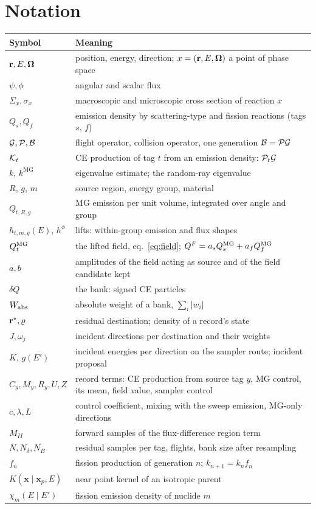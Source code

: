 \section{Notation}\label{app:notation}

\begin{longtable}{>{\raggedright}p{3.2cm}p{11cm}}
\toprule
Symbol & Meaning\\
\midrule
$\mathbf r,E,\boldsymbol\Omega$ & position, energy, direction; $x=(\mathbf r,E,\boldsymbol\Omega)$ a point of phase space\\
$\psi,\phi$ & angular and scalar flux\\
$\Sigma_x,\sigma_x$ & macroscopic and microscopic cross section of reaction $x$\\
$Q_s,Q_f$ & emission density by scattering-type and fission reactions (tags $s$, $f$)\\
$\mathcal G,\mathcal P,\mathcal B$ & flight operator, collision operator, one generation $\mathcal B=\mathcal P\mathcal G$\\
$\mathcal K_t$ & CE production of tag $t$ from an emission density: $\mathcal P_t\mathcal G$\\
$k$, $k^{\mathrm{MG}}$ & eigenvalue estimate; the random-ray eigenvalue\\
$R$, $g$, $m$ & source region, energy group, material\\
$Q_{t,R,g}$ & MG emission per unit volume, integrated over angle and group\\
$h_{t,m,g}(E)$, $h^\phi$ & lifts: within-group emission and flux shapes\\
$Q^{\mathrm{MG}}_t$ & the lifted field, eq.~\eqref{eq:field}; $Q^F=a_sQ^{\mathrm{MG}}_s+a_fQ^{\mathrm{MG}}_f$\\
$a,b$ & amplitudes of the field acting as source and of the field candidate kept\\
$\delta Q$ & the bank: signed CE particles\\
$W_{\mathrm{abs}}$ & absolute weight of a bank, $\sum_i|w_i|$\\
$\mathbf r^\star,\varrho$ & residual destination; density of a record's state\\
$J,\omega_j$ & incident directions per destination and their weights\\
$K$, $g(E')$ & incident energies per direction on the sampler route; incident proposal\\
$C_y,M_y,R_y,U,Z$ & record terms: CE production from source tag $y$, MG control, its mean, field value, sampler control\\
$c,\lambda,L$ & control coefficient, mixing with the sweep emission, MG-only directions\\
$M_{II}$ & forward samples of the flux-difference region term\\
$N,N_\delta,N_B$ & residual samples per tag, flights, bank size after resampling\\
$f_n$ & fission production of generation $n$; $k_{n+1}=k_nf_n$\\
$K(\mathbf x\mid\mathbf x_p,E)$ & near point kernel of an isotropic parent\\
$\chi_m(E\mid E')$ & fission emission density of nuclide $m$\\
\bottomrule
\end{longtable}

